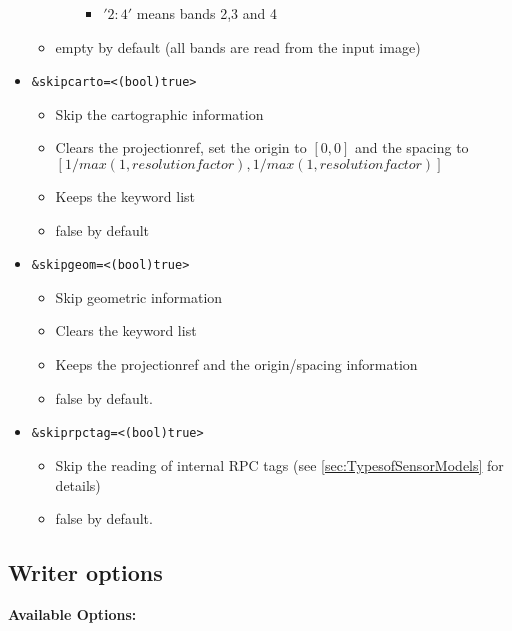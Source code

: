\begin{itemize}
\begin{itemize}
\begin{itemize}
\begin{itemize}
            \item $'2:4'$ means bands 2,3 and 4
          \end{itemize}
      \end{itemize}
    \item empty by default (all bands are read from the input image) 
\end{itemize}
\item \begin{verbatim}&skipcarto=<(bool)true>\end{verbatim}
  \begin{itemize}
  \item Skip the cartographic information
  \item Clears the projectionref, set the origin to $[0,0]$ and the spacing to $[1/max(1,resolution factor),1/max(1,resolution factor)]$
  \item Keeps the keyword list
  \item false by default 
  \end{itemize}
\item \begin{verbatim}&skipgeom=<(bool)true>\end{verbatim}
  \begin{itemize}
  \item Skip geometric information
  \item Clears the keyword list
  \item Keeps the projectionref and the origin/spacing information
  \item false by default. 
  \end{itemize}
\item \begin{verbatim}&skiprpctag=<(bool)true>\end{verbatim}
  \begin{itemize}
  \item Skip the reading of internal RPC tags (see \ref{sec:TypesofSensorModels} for details)
  \item false by default. 
  \end{itemize}
\end{itemize}

\subsection{Writer options}

\textbf{Available Options:}

